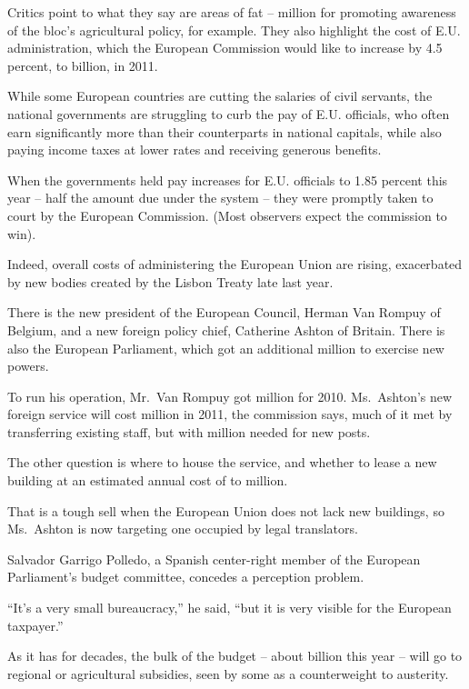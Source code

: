 ﻿\documentclass[12pt]{article}
\begin{document}
Critics point to what they say are areas of fat --  million for promoting awareness of the
bloc's agricultural policy, for example. They also highlight the cost of E.U. administration, which
the European Commission would like to increase by 4.5 percent, to  billion, in 2011.

While some European countries are cutting the salaries of civil servants, the national governments
are struggling to curb the pay of E.U. officials, who often earn significantly more than their
counterparts in national capitals, while also paying income taxes at lower rates and receiving
generous benefits.

When the governments held pay increases for E.U. officials to 1.85 percent this year -- half the
amount due under the system -- they were promptly taken to court by the European Commission. (Most
observers expect the commission to win).

Indeed, overall costs of administering the European Union are rising, exacerbated by new bodies
created by the Lisbon Treaty late last year.

There is the new president of the European Council, Herman Van Rompuy of Belgium, and a new foreign
policy chief, Catherine Ashton of Britain. There is also the European Parliament, which got an
additional  million to exercise new powers.

To run his operation, Mr.~Van Rompuy got  million for 2010. Ms.~Ashton's new foreign
service will cost  million in 2011, the commission says, much of it met by transferring
existing staff, but with  million needed for new posts.

The other question is where to house the service, and whether to lease a new building at an
estimated annual cost of  to  million.

That is a tough sell when the European Union does not lack new buildings, so Ms.~Ashton is now
targeting one occupied by legal translators.

Salvador Garrigo Polledo, a Spanish center-right member of the European Parliament's budget
committee, concedes a perception problem.

``It's a very small bureaucracy,'' he said, ``but it is very visible for the European taxpayer.''

As it has for decades, the bulk of the budget -- about  billion this year -- will go to
regional or agricultural subsidies, seen by some as a counterweight to austerity.
\end{document}
